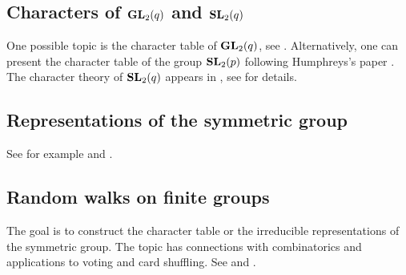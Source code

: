



\subsection*{Characters of $\mathbf{GL}_2(q)$ and $\mathbf{SL}_2(q)$}

One possible topic is the character table of $\mathbf{GL}_2(q)$, see
\cite[\S5.2]{MR2867444}. Alternatively, one can 
present the character table of the group $\mathbf{SL}_2(p)$  
following Humphreys's paper \cite{MR364478}. 
The character theory of $\mathbf{SL}_2(q)$ appears in 
\cite[\S5.2]{MR2867444}, see 
\cite[Chapter 20]{MR1650707} for details. 

\subsection*{Representations of the symmetric group}

See for example \cite[\S10]{MR2867444} and 
\cite{MR1153249}. 

\subsection*{Random walks on finite groups}

The goal is to construct the character table or 
the irreducible representations of the symmetric group. 
The topic has connections with combinatorics and applications 
to voting and card shuffling. 
See \cite[4]{MR1153249} and \cite[\S11]{MR2867444}.


